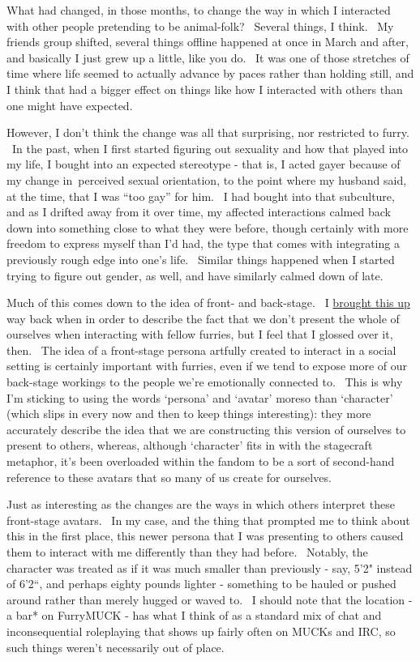 What had changed, in those months, to change the way in which I
interacted with other people pretending to be animal-folk? ~Several
things, I think. ~My friends group shifted, several things offline
happened at once in March and after, and basically I just grew up a
little, like you do. ~It was one of those stretches of time where life
seemed to actually advance by paces rather than holding still, and I
think that had a bigger effect on things like how I interacted with
others than one might have expected.

However, I don't think the change was all that surprising, nor
restricted to furry. ~In the past, when I first started figuring out
sexuality and how that played into my life, I bought into an expected
stereotype - that is, I acted gayer because of my change in~perceived
sexual orientation, to the point where my husband said, at the time,
that I was ``too gay'' for him. ~I had bought into that subculture, and
as I drifted away from it over time, my affected interactions calmed
back down into something close to what they were before, though
certainly with more freedom to express myself than I'd had, the type
that comes with integrating a previously rough edge into one's life.
~Similar things happened when I started trying to figure out gender, as
well, and have similarly calmed down of late.

Much of this comes down to the idea of front- and back-stage. ~I
\href{http://adjectivespecies.com/2011/12/07/character-versus-self-2/}{brought
this up} way back when in order to describe the fact that we don't
present the whole of ourselves when interacting with fellow furries, but
I feel that I glossed over it, then. ~The idea of a front-stage persona
artfully created to interact in a social setting is certainly important
with furries, even if we tend to expose more of our back-stage workings
to the people we're emotionally connected to. ~This is why I'm sticking
to using the words `persona' and `avatar' moreso than `character' (which
slips in every now and then to keep things interesting): they more
accurately describe the idea that we are constructing this version of
ourselves to present to others, whereas, although `character' fits in
with the stagecraft metaphor, it's been overloaded within the fandom to
be a sort of second-hand reference to these avatars that so many of us
create for ourselves.

Just as interesting as the changes are the ways in which others
interpret these front-stage avatars. ~In my case, and the thing that
prompted me to think about this in the first place, this newer persona
that I was presenting to others caused them to interact with me
differently than they had before. ~Notably, the character was treated as
if it was much smaller than previously - say, 5'2" instead of 6'2``, and
perhaps eighty pounds lighter - something to be hauled or pushed around
rather than merely hugged or waved to. ~I should note that the location
- a bar* on FurryMUCK - has what I think of as a standard mix of chat
and inconsequential roleplaying that shows up fairly often on MUCKs and
IRC, so such things weren't necessarily out of place.

